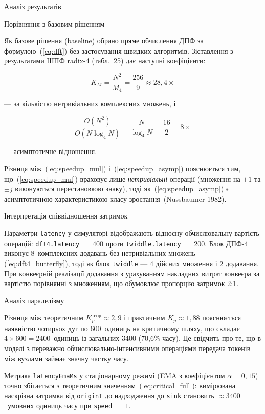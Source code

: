 \protect{}\label{_Toc229681174}{}Аналіз результатів

Порівняння з базовим рішенням

Як базове рішення (baseline) обрано пряме обчислення ДПФ за
формулою~(\hyperref[eq:dft]{{[}eq:dft{]}}) без застосування швидких
алгоритмів. Зіставлення з результатами ШПФ radix-4
(табл.~\hyperref[tab:complexity]{25}) дає наступні коефіцієнти:

\[K_{M} = \frac{N^{2}}{M_{4}} = \frac{256}{9} \approx 28,4 \times\]

--- за кількістю нетривіальних комплексних множень, і

\[\frac{O(N^{2})}{O(N\log_{4}N)} = \frac{N}{\log_{4}N} = \frac{16}{2} = 8 \times\]

--- асимптотичне відношення.

Різниця між~(\hyperref[eq:speedup_mul]{{[}eq:speedup\_mul{]}})
і~(\hyperref[eq:speedup_asymp]{{[}eq:speedup\_asymp{]}}) пояснюється
тим, що~(\hyperref[eq:speedup_mul]{{[}eq:speedup\_mul{]}}) враховує лише
\emph{нетривіальні} операції (множення на \(\pm 1\) та \(\pm j\)
виконуються перестановкою знаку), тоді
як~(\hyperref[eq:speedup_asymp]{{[}eq:speedup\_asymp{]}}) є
асимптотичною характеристикою класу зростання~(Nussbaumer 1982).

Інтерпретація співвідношення затримок

Параметри \texttt{latency} у симуляторі відображають відносну
обчислювальну вартість операцій: \texttt{dft4.latency}~\(= 400\) проти
\texttt{twiddle.latency}~\(= 200\). Блок ДПФ-4 виконує 8~комплексних
додавань без нетривіальних множень
(\hyperref[eq:dft4_butterfly]{{[}eq:dft4\_butterfly{]}}), тоді як блок
\texttt{twiddle} --- 4 дійсних множення і 2 додавання. При конвеєрній
реалізації додавання з урахуванням накладних витрат конвеєра за вартістю
порівнянні з множенням, що обумовлює пропорцію затримок 2:1.

Аналіз паралелізму

Різниця між теоретичним \(K_{p}^{\text{теор}} \approx 2,9\) і практичним
\(K_{p} \approx 1,88\) пояснюється наявністю чотирьох дуг по 600~одиниць
на критичному шляху, що складає \(4 \times 600 = 2400\)~одиниць із
загальних 3400 (70,6\% часу). Це свідчить про те, що в моделі з
переважно обчислювально-інтенсивними операціями передача токенів між
вузлами займає значну частку часу.

Метрика \texttt{latencyEmaMs} у стаціонарному режимі (EMA з коефіцієнтом
\(\alpha = 0,15\)) точно збігається з теоретичним
значенням~(\hyperref[eq:critical_full]{{[}eq:critical\_full{]}}):
вимірювана наскрізна затримка від \texttt{originT} до надходження до
\texttt{sink} становить \(\approx 3400\)~умовних одиниць часу при
\texttt{speed}~\(= 1\).

